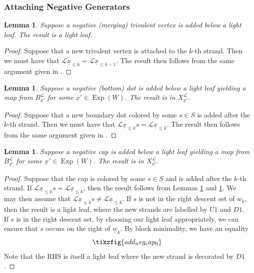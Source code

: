 \documentclass{amsart}
\newcommand{\scrL}{\mathcal{L}}
\DeclareMathOperator{\Exp}{Exp}
\newcommand{\uw}{\underline{w}}
\newcommand{\ux}{\underline{x}}
\newtheorem{lemma}[subsubsection]{Lemma}
\theoremstyle{definition}
\numberwithin{equation}{subsection}
\begin{document}
\subsubsection{Attaching Negative Generators}

\begin{lemma}\label{lem:add_neg_trivalent}
    Suppose a negative (merging) trivalent vertex is added below a light leaf. The result is a light leaf. 
\end{lemma}
\begin{proof}
    Suppose that a new trivalent vertex is attached to the $k$-th strand. Then we must have that $\scrL \ux_{\leq k} = \scrL \ux_{\leq k-1}$.
    The result then follows from the same argument given in \cite[Claim 7.9]{EW}.   
\end{proof}

\begin{lemma}\label{lem:add_neg_dot}
    Suppose a negative (bottom) dot is added below a light leaf yielding a map from $B_{\ux'}^{\scrL}$ for some $\ux' \in \Exp (W)$. The result is in $X_{\ux'}^{\scrL}$.
\end{lemma}
\begin{proof}
    Suppose that a new boundary dot colored by some $s \in S$ is added after the $k$-th strand. 
    Then we must have that $\scrL \ux_{\leq k} s = \scrL \ux_{\leq k}$.
    The result then follows from the same argument given in \cite[Claim 7.10]{EW}.   
\end{proof}

\begin{lemma}\label{lem:add_neg_cap}
    Suppose a negative cap is added below a light leaf yielding a map from $B_{\ux'}^{\scrL}$ for some $\ux' \in \Exp (W)$. The result is in $X_{\ux'}^{\scrL}$.
\end{lemma}
\begin{proof}
    Suppose that the cap is colored by some $s \in S$ and is added after the $k$-th strand.
    If $\scrL \ux_{\leq k} s = \scrL \ux_{\leq k}$, then the result follows from Lemmas \ref{lem:add_neg_trivalent} and \ref{lem:add_neg_dot}.
    We may then assume that $\scrL \ux_{\leq k} s \neq \scrL \ux_{\leq k}$.
    If $s$ is not in the right descent set of $w_k$, then the result is a light leaf, where the new strands are labelled by $U1$ and $D1$.
    If $s$ is in the right descent set, by choosing our light leaf appropriately, we can ensure that $s$ occurs on the right of $\uw_k$.
    By block minimality, we have an equality
    \[\tikzfig{add_neg_cap_0}\]
    Note that the RHS is itself a light leaf where the new strand is decorated by $D1$.
\end{proof}
\end{document}
